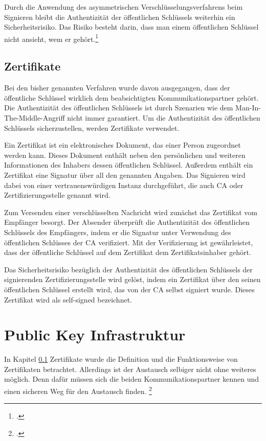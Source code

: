 \documentclass  [paper=a4,
				fontsize=12pt,
				listof=totoc,
				bibliography=totoc
				]{scrreprt}
\begin{document}
				Durch die Anwendung des asymmetrischen Verschlüsselungsverfahrens beim Signieren bleibt die Authentizität der öffentlichen Schlüssels weiterhin ein Sicherheitsrisiko. Das Risiko besteht darin, dass	\glqq man einem öffentlichen Schlüssel nicht ansieht, wem er gehört\grqq{}.\footcite[S. 506]{Schmeh2013}
	
			\subsection{Zertifikate}\label{chp: zertifikate}
				Bei den bisher genannten Verfahren wurde davon ausgegangen, dass der öffentliche Schlüssel wirklich dem beabsichtigten Kommunikationspartner gehört. Die Authentizität des öffentlichen Schlüssels ist durch Szenarien wie dem Man-In-The-Middle-Angriff nicht immer garantiert. Um die Authentizität des öffentlichen Schlüssels sicherzustellen, werden Zertifikate verwendet.
				
				Ein Zertifikat ist ein elektronisches Dokument, das einer Person zugeordnet werden kann. Dieses Dokument enthält neben den persönlichen und weiteren Informationen des Inhabers dessen öffentlichen Schlüssel. Außerdem enthält ein Zertifikat eine Signatur über all den genannten Angaben. Das Signieren wird dabei von einer vertrauenswürdigen Instanz durchgeführt, die auch \ac{CA} oder Zertifizierungsstelle genannt wird.
				
				Zum Versenden einer verschlüsselten Nachricht wird zunächst das Zertifikat vom Empfänger besorgt. Der Absender überprüft die Authentizität des öffentlichen Schlüssels des Empfängers, indem er die Signatur unter Verwendung des öffentlichen Schlüsses der \ac{CA} verifiziert. Mit der Verifizierung ist gewährleistet, dass der öffentliche Schlüssel auf dem Zertifikat dem Zertifikatsinhaber gehört.
				
				Das Sicherheitsrisiko bezüglich der Authentizität des öffentlichen Schlüssels der signierenden Zertifizierungsstelle wird gelöst, indem ein Zertifikat über den seinen öffentlichen Schlüssel erstellt wird, das von der \ac{CA} selbst signiert wurde. Dieses Zertifikat wird als self-signed bezeichnet.
	
		\section{Public Key Infrastruktur}
			In Kapitel \ref*{chp: zertifikate} Zertifikate wurde die Definition und die Funktionsweise von Zertifikaten betrachtet. Allerdings ist der Austausch selbiger nicht ohne weiteres möglich. Denn dafür müssen sich die beiden Kommunikationspartner \glqq kennen und einen sicheren Weg für den Austausch finden\grqq{}. \footcite[Vgl.][]{BSI}\medskip\\
			
\end{document}
